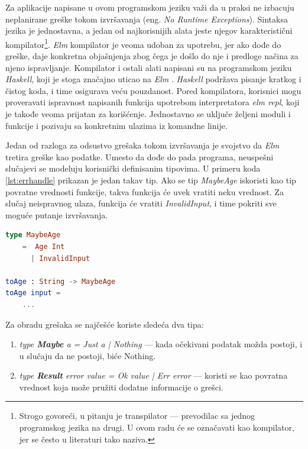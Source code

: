 \documentclass[12pt,oneside]{memoir}
\begin{document}
\par Za aplikacije napisane u ovom programskom jeziku važi da u praksi ne izbacuju neplanirane greške tokom izvršavanja (eng. \emph{No Runtime Exceptions}). Sintaksa jezika je jednostavna, a jedan od najkorisnijih alata jeste njegov karakteristični kompilator\footnote{Strogo govoreći, u pitanju je transpilator --- prevodilac sa jednog programskog jezika na drugi. U ovom radu će se označavati kao kompilator, jer se često u literaturi tako naziva.}. \emph{Elm} kompilator je veoma udoban za upotrebu, jer ako dođe do greške, daje konkretna objašnjenja zbog čega je došlo do nje i predloge načina za njeno ispravljanje. Kompilator i ostali alati napisani su na programskom jeziku \emph{Haskell}, koji je stoga značajno uticao na \emph{Elm} \cite{haskell}. \emph{Haskell} podržava pisanje kratkog i čistog koda, i time osigurava veću pouzdanost. Pored kompilatora, korisnici mogu proveravati ispravnost napisanih funkcija upotrebom interpretatora \emph{elm repl}, koji je takođe veoma prijatan za korišćenje. Jednostavno se uključe željeni moduli i funkcije i pozivaju sa konkretnim ulazima iz komandne linije.
\par Jedan od razloga za odsustvo grešaka tokom izvršavanja je svojstvo da \emph{Elm} tretira greške kao podatke. Umesto da dođe do pada programa, neuspešni slučajevi se modeluju korisnički definisanim tipovima. U primeru koda \ref{lst:errhandle} prikazan je jedan takav tip. Ako se tip \emph{MaybeAge} iskoristi kao tip povratne vrednosti funkcije, takva funkcija će uvek vratiti neku vrednost. Za slučaj neispravnog ulaza, funkcija će vratiti \emph{InvalidInput}, i time pokriti sve moguće putanje izvršavanja. 

\begin{minipage}{\linewidth}
\begin{lstlisting}[language=elm, basicstyle=\small, caption={Primer definicije i upotrebe korisnički definisanog tipa},captionpos=b, label={lst:errhandle}]
type MaybeAge
	=  Age Int
	  | InvalidInput
	  
toAge : String -> MaybeAge
toAge input = 
	... 
\end{lstlisting}
\end{minipage}

\par Za obradu grešaka se najčešće koriste sledeća dva tipa: 

\begin{enumerate}
\item \emph{type \textbf{Maybe} a = Just a | Nothing} --- kada očekivani podatak možda postoji, i u slučaju da ne postoji, biće Nothing.
\item \emph{type \textbf{Result} error value = Ok value | Err error} --- koristi se kao povratna vrednost koja može pružiti dodatne informacije o grešci.
\end{enumerate}
\end{document}
